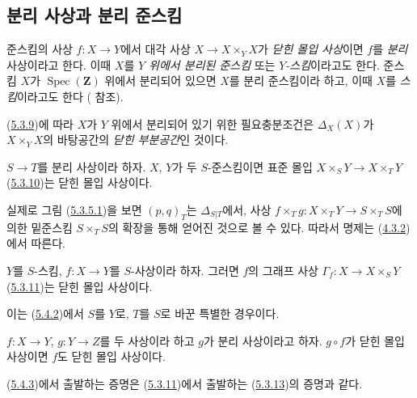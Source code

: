 \subsection{분리 사상과 분리 준스킴}
\label{subsection:I.5.4-ko}

\begin{definition}[5.4.1]
\label{I.5.4.1-ko}
준스킴의 사상 $f:X\to Y$에서 대각 사상
$X\to X\times_Y X$가 \emph{닫힌 몰입 사상}이면 $f$를
\emph{분리} 사상이라고 한다. 이때 $X$를 \emph{$Y$ 위에서 분리된
준스킴} 또는 \emph{$Y$-스킴}이라고도 한다. 준스킴 $X$가
$\operatorname{Spec}(\mathbf{Z})$ 위에서 분리되어 있으면 $X$를 분리
준스킴이라 하고, 이때 $X$를 \emph{스킴}이라고도 한다
( 참조).
\end{definition}

(\hyperref[I.5.3.9-ko]{5.3.9})에 따라 $X$가 $Y$ 위에서 분리되어 있기
위한 필요충분조건은 $\Delta_X(X)$가 $X\times_Y X$의 바탕공간의
\emph{닫힌 부분공간}인 것이다.

\begin{proposition}[5.4.2]
\label{I.5.4.2-ko}
$S\to T$를 분리 사상이라 하자. $X$, $Y$가 두 $S$-준스킴이면 표준
몰입 $X\times_S Y\to X\times_T Y$
(\hyperref[I.5.3.10-ko]{5.3.10})는 닫힌 몰입 사상이다.
\end{proposition}

실제로 그림 (\hyperref[I.5.3.5.1-ko]{5.3.5.1})을 보면 $(p,q)_T$는
$\Delta_{S|T}$에서, 사상
$f\times_T g:X\times_T Y\to S\times_T S$에 의한 밑준스킴
$S\times_T S$의 확장을 통해 얻어진 것으로 볼 수 있다. 따라서 명제는
(\hyperref[I.4.3.2-ko]{4.3.2})에서 따른다.

\begin{corollary}[5.4.3]
\label{I.5.4.3-ko}
$Y$를 $S$-스킴, $f:X\to Y$를 $S$-사상이라 하자. 그러면 $f$의
그래프 사상 $\Gamma_f:X\to X\times_S Y$
(\hyperref[I.5.3.11-ko]{5.3.11})는 닫힌 몰입 사상이다.
\end{corollary}

이는 (\hyperref[I.5.4.2-ko]{5.4.2})에서 $S$를 $Y$로, $T$를 $S$로
바꾼 특별한 경우이다.

\begin{corollary}[5.4.4]
\label{I.5.4.4-ko}
$f:X\to Y$, $g:Y\to Z$를 두 사상이라 하고 $g$가 분리 사상이라고
하자. $g\circ f$가 닫힌 몰입 사상이면 $f$도 닫힌 몰입 사상이다.
\end{corollary}

(\hyperref[I.5.4.3-ko]{5.4.3})에서 출발하는 증명은
(\hyperref[I.5.3.11-ko]{5.3.11})에서 출발하는
(\hyperref[I.5.3.13-ko]{5.3.13})의 증명과 같다.

